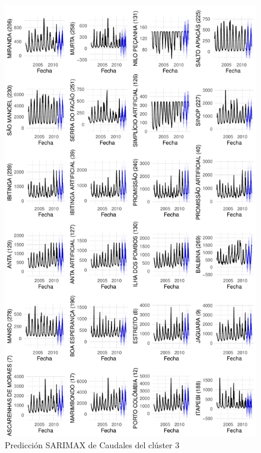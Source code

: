 \documentclass[12pt,oneside]{book}\usepackage[]{graphicx}\usepackage[]{color}
\makeatletter
\def\maxwidth{ %
  \ifdim\Gin@nat@width>\linewidth
    \linewidth
  \else
    \Gin@nat@width
  \fi
}
\newenvironment{knitrout}{}{} %
\theoremstyle{definition} %
\makeatother
\begin{document}
\begin{knitrout}
\color{fgcolor}\begin{figure}[h]

{\centering \includegraphics[width=\maxwidth,height=0.85\textheight]{figure/unnamed-chunk-112-1} 

}

\caption{\label{fig:pred_clx3_2} Predicción SARIMAX de Caudales del clúster 3}\label{fig:unnamed-chunk-112}
\end{figure}


\end{knitrout}
\end{document}
